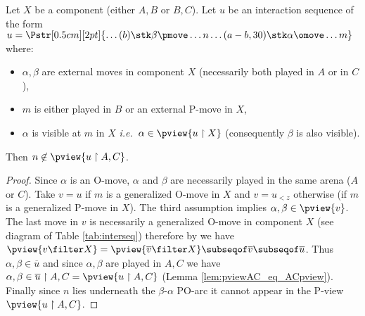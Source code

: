\begin{lemma}
\label{lem:interjump}
Let $X$ be a component (either  $A,B$ or  $B,C$).
Let $u$ be an interaction sequence of the form
$ u =
\Pstr[0.5cm][2pt]{ \ldots (b){\stk \beta \pmove}  \ldots
 {n}  \ldots  (a-b,30){\stk \alpha\omove}
\ldots m}$ where:
\begin{itemize}[-]
\item $\alpha,\beta$ are external moves in component $X$ (necessarily both played in $A$ or in $C$),
\item  $m$ is either played in $B$ or an external P-move in $X$,
\item  $\alpha$ is visible at $m$ in $X$ \emph{i.e.}~$\alpha\in \pview{u \upharpoonright X}$ (consequently $\beta$ is also visible).
\end{itemize}
Then $n \not\in \pview{u \upharpoonright A, C}$.
\end{lemma}
\begin{proof}
Since $\alpha$ is an O-move, $\alpha$ and $\beta$ are necessarily played in the same arena ($A$ or $C$).
Take $v=u$ if $m$ is a generalized O-move in $X$
and $v=u_{<z}$ otherwise (if $m$ is a generalized P-move in $X$).
The third assumption implies
$\alpha,\beta\in \pview{v}$.
The last move in $v$ is necessarily a generalized O-move in component $X$ (see diagram of Table \ref{tab:interseq})
therefore by \cite[Lemma 3.3.1]{Harmer2005}
we have $\pview{v \filter X} = \pview{\overline{v} \filter X} \subseqof \overline{v} \subseqof \overline{u}$.
Thus $\alpha,\beta \in \overline{u}$ and
since $\alpha,\beta$ are played in $A,C$ we have
$\alpha,\beta  \in \overline{u} \upharpoonright A,C
= \pview{u \upharpoonright A,C}$ (Lemma \ref{lem:pviewAC_eq_ACpview}).
Finally since $n$ lies underneath the $\beta$-$\alpha$ PO-arc
it cannot appear in the P-view  $\pview{u \upharpoonright A,C}$.
\end{proof}

